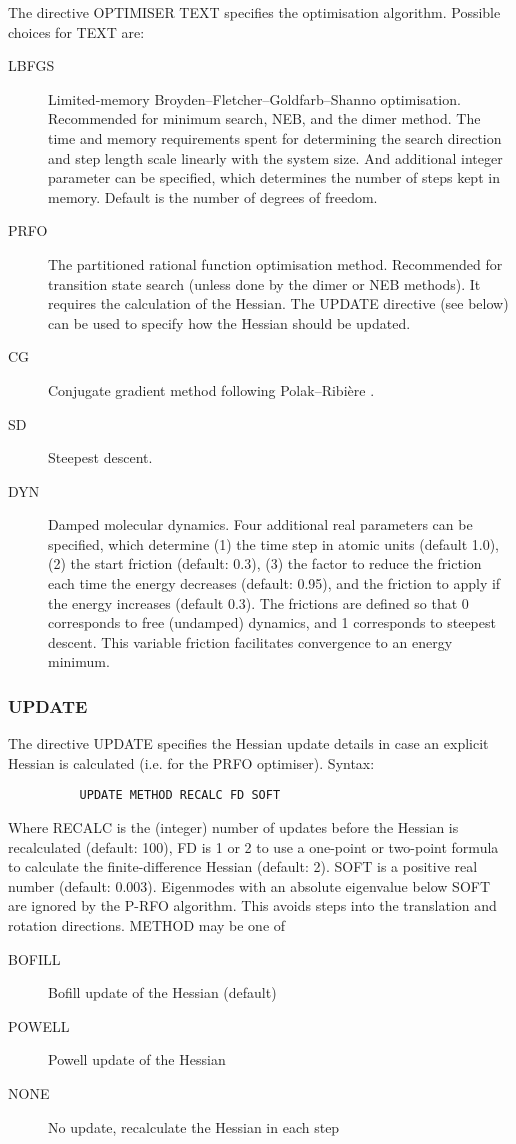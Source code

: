 \documentclass[11pt,fleqn]{article}
\begin{document}
The directive OPTIMISER TEXT specifies the optimisation algorithm. Possible
choices for TEXT are:
\begin{description}
\item[LBFGS] Limited-memory Broyden--Fletcher--Goldfarb--Shanno optimisation.
  Recommended for minimum search, NEB, and the dimer method. The time and
  memory requirements spent for determining the search direction and step
  length scale linearly with the system size. And additional integer parameter
  can be specified, which determines the number of steps kept in
  memory. Default is the number of degrees of freedom.
\item[PRFO] The partitioned rational function optimisation method. Recommended
  for transition state search (unless done by the dimer or NEB methods). It
  requires the calculation of the Hessian. The UPDATE directive (see below)
  can be used to specify how the Hessian should be updated.
\item[CG] Conjugate gradient method following Polak--Ribi\`ere \cite{pol69}.
\item[SD] Steepest descent.
\item[DYN] Damped molecular dynamics. Four additional real parameters can be
  specified, which determine (1) the time step in atomic units (default 1.0),
  (2) the start friction (default: 0.3), (3) the factor to reduce the friction
  each time the energy decreases (default: 0.95), and the friction to apply if
  the energy increases (default 0.3). The frictions are defined so that 0
  corresponds to free (undamped) dynamics, and 1 corresponds to steepest
  descent. This variable friction facilitates convergence to an energy minimum.
\end{description}

\subsubsection{UPDATE}

The directive UPDATE specifies the Hessian update details in case an explicit
Hessian is calculated (i.e. for the PRFO optimiser). Syntax:

{
\footnotesize
\begin{verbatim}
          UPDATE METHOD RECALC FD SOFT
\end{verbatim}
} 

Where RECALC is the (integer) number of updates before the Hessian is
recalculated (default: 100), FD is 1 or 2 to use a one-point or two-point
formula to calculate the finite-difference Hessian (default: 2). SOFT is a
positive real number (default: 0.003). Eigenmodes with an absolute eigenvalue
below SOFT are ignored by the P-RFO algorithm. This avoids steps into the
translation and rotation directions. METHOD may be one of
\begin{description}
\item[BOFILL] Bofill update of the Hessian (default)
\item[POWELL] Powell update of the Hessian
\item[NONE]   No update, recalculate the Hessian in each step
\end{description}
\end{document}
